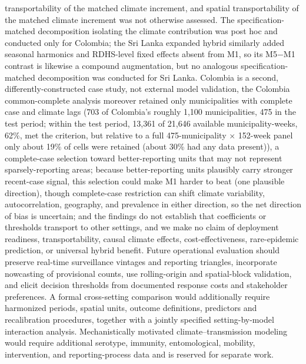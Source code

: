 \documentclass[11pt,a4paper]{article}
\begin{document}
transportability of the matched climate increment, and spatial transportability of the matched climate increment was not otherwise assessed. The specification-matched decomposition isolating the climate contribution was post hoc and conducted only for Colombia; the Sri Lanka expanded hybrid similarly added seasonal harmonics and RDHS-level fixed effects absent from M1, so its M5$-$M1 contrast is likewise a compound augmentation, but no analogous specification-matched decomposition was conducted for Sri Lanka. Colombia is a second, differently-constructed case study, not external model validation, the Colombia common-complete analysis moreover retained only municipalities with complete case and climate lags (703 of Colombia's roughly 1,100 municipalities, 475 in the test period; within the test period, 13,361 of 21,646 available municipality-weeks, 62\%, met the criterion, but relative to a full 475-municipality $\times$ 152-week panel only about 19\% of cells were retained (about 30\% had any data present)), a complete-case selection toward better-reporting units that may not represent sparsely-reporting areas; because better-reporting units plausibly carry stronger recent-case signal, this selection could make M1 harder to beat (one plausible direction), though complete-case restriction can shift climate variability, autocorrelation, geography, and prevalence in either direction, so the net direction of bias is uncertain; and the findings do not establish that coefficients or thresholds transport to other settings, and we make no claim of deployment readiness, transportability, causal climate effects, cost-effectiveness, rare-epidemic prediction, or universal hybrid benefit. Future operational evaluation should preserve real-time surveillance vintages and reporting triangles, incorporate nowcasting of provisional counts, use rolling-origin and spatial-block validation, and elicit decision thresholds from documented response costs and stakeholder preferences. A formal cross-setting comparison would additionally require harmonized periods, spatial units, outcome definitions, predictors and recalibration procedures, together with a jointly specified setting-by-model interaction analysis. Mechanistically motivated climate--transmission modeling would require additional serotype, immunity, entomological, mobility, intervention, and reporting-process data and is reserved for separate work.
\end{document}
